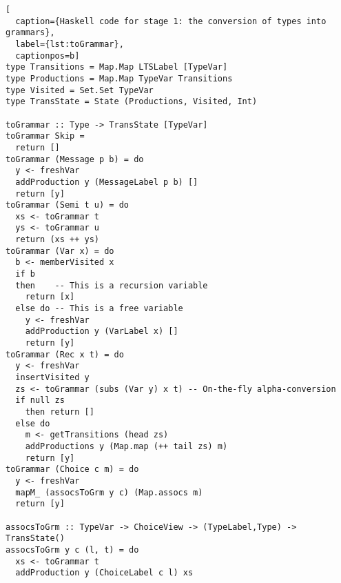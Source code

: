\begin{lstlisting}[
  caption={Haskell code for stage 1: the conversion of types into grammars},
  label={lst:toGrammar},
  captionpos=b]
type Transitions = Map.Map LTSLabel [TypeVar]
type Productions = Map.Map TypeVar Transitions
type Visited = Set.Set TypeVar
type TransState = State (Productions, Visited, Int)

toGrammar :: Type -> TransState [TypeVar]
toGrammar Skip =
  return []
toGrammar (Message p b) = do
  y <- freshVar
  addProduction y (MessageLabel p b) []
  return [y]
toGrammar (Semi t u) = do
  xs <- toGrammar t
  ys <- toGrammar u
  return (xs ++ ys)
toGrammar (Var x) = do
  b <- memberVisited x
  if b
  then    -- This is a recursion variable
    return [x]
  else do -- This is a free variable
    y <- freshVar
    addProduction y (VarLabel x) []
    return [y]
toGrammar (Rec x t) = do
  y <- freshVar
  insertVisited y
  zs <- toGrammar (subs (Var y) x t) -- On-the-fly alpha-conversion
  if null zs
    then return []
  else do
    m <- getTransitions (head zs)
    addProductions y (Map.map (++ tail zs) m)
    return [y]
toGrammar (Choice c m) = do
  y <- freshVar
  mapM_ (assocsToGrm y c) (Map.assocs m)
  return [y]

assocsToGrm :: TypeVar -> ChoiceView -> (TypeLabel,Type) -> TransState()
assocsToGrm y c (l, t) = do
  xs <- toGrammar t
  addProduction y (ChoiceLabel c l) xs
\end{lstlisting}

